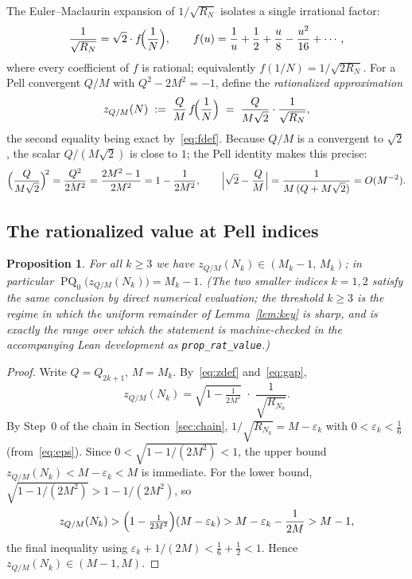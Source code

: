 \documentclass[10pt,a4paper]{amsart}
\newtheorem{proposition}[theorem]{Proposition}
\DeclareMathOperator{\PQ}{PQ}
\begin{document}
The Euler--Maclaurin expansion of $1/\sqrt{R_N}$ isolates a single
irrational factor:
\begin{equation}\label{eq:fdef}
  \frac{1}{\sqrt{R_N}} = \sqrt{2}\cdot f\!\Bigl(\frac{1}{N}\Bigr),
  \qquad
  f(u) = \frac{1}{u} + \frac{1}{2} + \frac{u}{8} - \frac{u^2}{16}
         + \cdots,
\end{equation}
where every coefficient of $f$ is rational; equivalently
$f(1/N) = 1/\sqrt{2R_N}$.  For a Pell convergent $Q/M$ with
$Q^2 - 2M^2 = -1$, define the \emph{rationalized approximation}
\begin{equation}\label{eq:zdef}
  z_{Q/M}(N) \;:=\; \frac{Q}{M}\, f\!\Bigl(\frac{1}{N}\Bigr)
             \;=\; \frac{Q}{M\sqrt{2}}\cdot\frac{1}{\sqrt{R_N}},
\end{equation}
the second equality being exact by~\eqref{eq:fdef}.  Because $Q/M$ is a
convergent to $\sqrt{2}$, the scalar $Q/(M\sqrt{2})$ is close to $1$; the
Pell identity makes this precise:
\begin{equation}\label{eq:gap}
  \Bigl(\frac{Q}{M\sqrt{2}}\Bigr)^{\!2}
  = \frac{Q^2}{2M^2} = \frac{2M^2-1}{2M^2} = 1 - \frac{1}{2M^2},
  \qquad
  \Bigl|\sqrt{2}-\frac{Q}{M}\Bigr| = \frac{1}{M\,(Q+M\sqrt{2})} = O(M^{-2}).
\end{equation}

\subsection{The rationalized value at Pell indices}

\begin{proposition}\label{prop:rat-value}
  For all $k \geq 3$ we have $z_{Q/M}(N_k) \in (M_k-1,\, M_k)$; in
  particular $\PQ_0\bigl(z_{Q/M}(N_k)\bigr) = M_k - 1$.  (The two smaller
  indices $k = 1, 2$ satisfy the same conclusion by direct numerical
  evaluation; the threshold $k \ge 3$ is the regime in which the uniform
  remainder of Lemma~\ref{lem:key} is sharp, and is exactly the range over
  which the statement is machine-checked in the accompanying Lean
  development as \texttt{prop\_rat\_value}.)
\end{proposition}

\begin{proof}
  Write $Q = Q_{2k+1}$, $M = M_k$.  By~\eqref{eq:zdef} and~\eqref{eq:gap},
  \[
    z_{Q/M}(N_k) = \sqrt{1-\tfrac{1}{2M^2}}\;\cdot\;\frac{1}{\sqrt{R_{N_k}}}.
  \]
  By Step~0 of the chain in Section~\ref{sec:chain}, $1/\sqrt{R_{N_k}}
  = M - \varepsilon_k$ with $0 < \varepsilon_k < \tfrac16$
  (from~\eqref{eq:eps}).  Since $0 < \sqrt{1-1/(2M^2)} < 1$, the upper
  bound $z_{Q/M}(N_k) < M-\varepsilon_k < M$ is immediate.  For the lower
  bound, $\sqrt{1-1/(2M^2)} > 1 - 1/(2M^2)$, so
  \[
    z_{Q/M}(N_k) > \Bigl(1-\tfrac{1}{2M^2}\Bigr)(M-\varepsilon_k)
    > M - \varepsilon_k - \frac{1}{2M} > M-1,
  \]
  the final inequality using $\varepsilon_k + 1/(2M) < \tfrac16 + \tfrac12 < 1$.
  Hence $z_{Q/M}(N_k) \in (M-1, M)$.
\end{proof}
\end{document}

